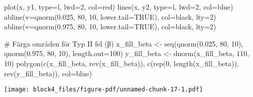 \documentclass[
  letterpaper,
  DIV=11,
  numbers=noendperiod]{scrartcl}
\newenvironment{Shaded}{\begin{snugshade}}{\end{snugshade}}
\newcommand{\AttributeTok}[1]{\textcolor[rgb]{0.40,0.45,0.13}{#1}}
\newcommand{\CommentTok}[1]{\textcolor[rgb]{0.37,0.37,0.37}{#1}}
\newcommand{\ConstantTok}[1]{\textcolor[rgb]{0.56,0.35,0.01}{#1}}
\newcommand{\DecValTok}[1]{\textcolor[rgb]{0.68,0.00,0.00}{#1}}
\newcommand{\FloatTok}[1]{\textcolor[rgb]{0.68,0.00,0.00}{#1}}
\newcommand{\FunctionTok}[1]{\textcolor[rgb]{0.28,0.35,0.67}{#1}}
\newcommand{\NormalTok}[1]{\textcolor[rgb]{0.00,0.23,0.31}{#1}}
\newcommand{\OtherTok}[1]{\textcolor[rgb]{0.00,0.23,0.31}{#1}}
\newcommand{\StringTok}[1]{\textcolor[rgb]{0.13,0.47,0.30}{#1}}
\begin{document}
\begin{Shaded}
\begin{Highlighting}[]
\FunctionTok{plot}\NormalTok{(x, y1, }\AttributeTok{type=}\StringTok{\textquotesingle{}l\textquotesingle{}}\NormalTok{, }\AttributeTok{lwd=}\DecValTok{2}\NormalTok{, }\AttributeTok{col=}\StringTok{\textquotesingle{}red\textquotesingle{}}\NormalTok{)}
\FunctionTok{lines}\NormalTok{(x, y2, }\AttributeTok{type=}\StringTok{\textquotesingle{}l\textquotesingle{}}\NormalTok{, }\AttributeTok{lwd=}\DecValTok{2}\NormalTok{, }\AttributeTok{col=}\StringTok{\textquotesingle{}blue\textquotesingle{}}\NormalTok{)}
\FunctionTok{abline}\NormalTok{(}\AttributeTok{v=}\FunctionTok{qnorm}\NormalTok{(}\FloatTok{0.025}\NormalTok{, }\DecValTok{80}\NormalTok{, }\DecValTok{10}\NormalTok{, }\AttributeTok{lower.tail=}\ConstantTok{TRUE}\NormalTok{), }\AttributeTok{col=}\StringTok{\textquotesingle{}black\textquotesingle{}}\NormalTok{, }\AttributeTok{lty=}\DecValTok{2}\NormalTok{)}
\FunctionTok{abline}\NormalTok{(}\AttributeTok{v=}\FunctionTok{qnorm}\NormalTok{(}\FloatTok{0.975}\NormalTok{, }\DecValTok{80}\NormalTok{, }\DecValTok{10}\NormalTok{, }\AttributeTok{lower.tail=}\ConstantTok{TRUE}\NormalTok{), }\AttributeTok{col=}\StringTok{\textquotesingle{}black\textquotesingle{}}\NormalTok{, }\AttributeTok{lty=}\DecValTok{2}\NormalTok{)}

\CommentTok{\# Färga områden för Typ II fel (β)}
\NormalTok{x\_fill\_beta }\OtherTok{\textless{}{-}} \FunctionTok{seq}\NormalTok{(}\FunctionTok{qnorm}\NormalTok{(}\FloatTok{0.025}\NormalTok{, }\DecValTok{80}\NormalTok{, }\DecValTok{10}\NormalTok{), }\FunctionTok{qnorm}\NormalTok{(}\FloatTok{0.975}\NormalTok{, }\DecValTok{80}\NormalTok{, }\DecValTok{10}\NormalTok{), }\AttributeTok{length.out=}\DecValTok{100}\NormalTok{)}
\NormalTok{y\_fill\_beta }\OtherTok{\textless{}{-}} \FunctionTok{dnorm}\NormalTok{(x\_fill\_beta, }\DecValTok{110}\NormalTok{, }\DecValTok{10}\NormalTok{)}
\FunctionTok{polygon}\NormalTok{(}\FunctionTok{c}\NormalTok{(x\_fill\_beta, }\FunctionTok{rev}\NormalTok{(x\_fill\_beta)),}
\FunctionTok{c}\NormalTok{(}\FunctionTok{rep}\NormalTok{(}\DecValTok{0}\NormalTok{, }\FunctionTok{length}\NormalTok{(x\_fill\_beta)), }\FunctionTok{rev}\NormalTok{(y\_fill\_beta)), }\AttributeTok{col=}\StringTok{\textquotesingle{}blue\textquotesingle{}}\NormalTok{)}
\end{Highlighting}
\end{Shaded}

\texttt{[image: block4\_files/figure-pdf/unnamed-chunk-17-1.pdf]}
\end{document}
